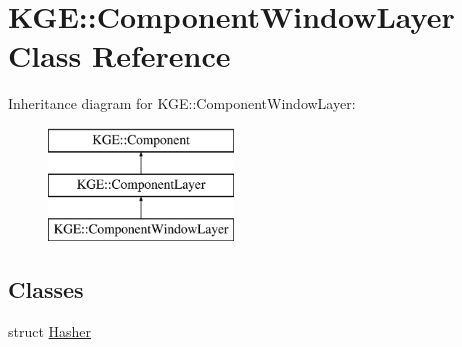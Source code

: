 \hypertarget{class_k_g_e_1_1_component_window_layer}{\section{K\-G\-E\-:\-:Component\-Window\-Layer Class Reference}
\label{class_k_g_e_1_1_component_window_layer}
}
Inheritance diagram for K\-G\-E\-:\-:Component\-Window\-Layer\-:\begin{figure}[H]
\begin{center}
\leavevmode
\includegraphics[height=3.000000cm]{class_k_g_e_1_1_component_window_layer}
\end{center}
\end{figure}
\subsection*{Classes}
\begin{DoxyCompactItemize}
\item 
struct \hyperlink{struct_k_g_e_1_1_component_window_layer_1_1_hasher}{Hasher}
\end{DoxyCompactItemize}
